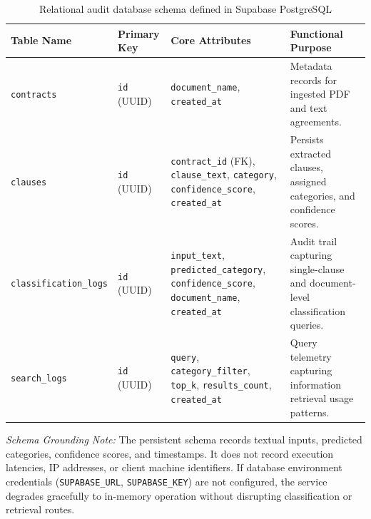 \begin{table}[htbp]
\centering
\footnotesize
\setlength{\tabcolsep}{3.5pt}
\begin{tabular}{>{\raggedright\arraybackslash}p{3.6cm} >{\raggedright\arraybackslash}p{1.8cm} >{\raggedright\arraybackslash}p{4.4cm} >{\raggedright\arraybackslash}p{4.8cm}}
\toprule
\textbf{Table Name} & \textbf{Primary Key} & \textbf{Core Attributes} & \textbf{Functional Purpose} \\
\midrule
\texttt{contracts} & \texttt{id} (UUID) & \texttt{document\_name}, \texttt{created\_at} & Metadata records for ingested PDF and text agreements. \\
\addlinespace
\texttt{clauses} & \texttt{id} (UUID) & \texttt{contract\_id} (FK), \texttt{clause\_text}, \texttt{category}, \texttt{confidence\_score}, \texttt{created\_at} & Persists extracted clauses, assigned categories, and confidence scores. \\
\addlinespace
\texttt{classification\_logs} & \texttt{id} (UUID) & \texttt{input\_text}, \texttt{predicted\_category}, \texttt{confidence\_score}, \texttt{document\_name}, \texttt{created\_at} & Audit trail capturing single-clause and document-level classification queries. \\
\addlinespace
\texttt{search\_logs} & \texttt{id} (UUID) & \texttt{query}, \texttt{category\_filter}, \texttt{top\_k}, \texttt{results\_count}, \texttt{created\_at} & Query telemetry capturing information retrieval usage patterns. \\
\bottomrule
\end{tabular}
\caption{Relational audit database schema defined in Supabase PostgreSQL}\label{tab:database_schema}
\end{table}

\textit{Schema Grounding Note:} The persistent schema records textual inputs, predicted categories, confidence scores, and timestamps. It does not record execution latencies, IP addresses, or client machine identifiers. If database environment credentials (\texttt{SUPABASE\_URL}, \texttt{SUPABASE\_KEY}) are not configured, the service degrades gracefully to in-memory operation without disrupting classification or retrieval routes.

